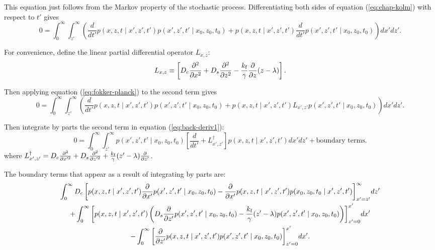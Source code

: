 \documentclass{article}
\newcommand{\tn}{\textnormal}
\newcommand{\stiff}{\frac{k_\tn{f}}{\gamma}}
\newcommand{\dd}{d}
\newcommand{\Der}[2]{\frac{\dd #1}{\dd #2}}
\newcommand{\Pder}[2]{\frac{\partial #1}{\partial #2}}
\newcommand{\Integral}[4]{\int_{#3}^{#4} {#1} \dd #2}
\newcommand{\xdiff}{\frac{\partial^2}{\partial x^2}}
\newcommand{\zdiff}{\frac{\partial^2}{\partial z^2}}
\begin{document}
This equation just follows from the Markov property of the stochastic
process. Differentiating both sides of equation (\ref{eq:chap-kolm})
with respect to $t'$ gives
\begin{equation}
  0 = \Integral{\Integral{\left(
      \Der{}{t'}p(x, z, t \mid x', z', t') p(x', z', t' \mid x_0, z_0, t_0)
      + p(x, z, t \mid x', z', t') \Der{}{t'}p(x', z', t' \mid x_0, z_0,
      t_0)\right)
    }{x'}{z'}{\infty}}{z'}{0}{\infty}.
\end{equation}

For convenience, define the linear partial differential operator
$L_{x, z}$:
\begin{equation}
  L_{x, z} \equiv \left[D_c \xdiff + D_s \zdiff - \stiff \Pder{}{z} (z
    - \lambda)\right].
  \label{eq:L-defn}
\end{equation}

Then applying equation (\ref{eq:fokker-planck}) to the second term gives 
\begin{equation}
  0 = \Integral{\Integral{\left(\Der{}{t'}p(x, z, t \mid x', z', t') p(x',
      z', t' \mid x_0, z_0, t_0) + p(x, z, t \mid x', z', t') L_{x', z'} p(x',
      z', t' \mid x_0, z_0, t_0)\right)}{x'}{z'}{\infty}}{z'}{0}{\infty}.
\label{eq:back-deriv1}
\end{equation}

Then integrate by parts the second term in equation
(\ref{eq:back-deriv1}):
\begin{equation}
  0 = \Integral{\Integral{p(x', z', t' \mid x_0, z_0, t_0) \left[\Der{}{t'}
        + L^\dag_{x', z'}\right] p(x, z, t \mid x', z',
      t')}{x'}{z'}{\infty}}{z'}{0}{\infty}
  + \text{boundary terms}.
  \label{eq:back-deriv2}
\end{equation}
where $L^\dag_{x', z'} = D_c \frac{\partial^2}{\partial x'^2} + D_s
\frac{\partial^2}{\partial z'^2} + \stiff (z' - \lambda) \Pder{}{z'}$.

The boundary terms that appear as a result of integrating by parts
are:
\begin{multline}
  \Integral{D_c \left[p(x, z, t \mid x', z', t') \Pder{}{x'} p(x', z',
      t' \mid x_0, z_0, t_0) - \Pder{}{x'} p(x, z, t \mid x', z', t') p(x_0,
      z_0, t_0 \mid x', z', t')\right]_{x' = z'}^\infty}{z'}{0}{\infty} \\
  + \Integral{\left[p(x, z, t \mid x', z', t') \left(D_s \Pder{}{z'} p(x',
      z', t' \mid x_0, z_0, t_0) - \stiff(z' - \lambda)p(x', z', t' \mid x_0,
      z_0, t_0)\right)\right]_{z' = 0}^{x'}}{x'}{0}{\infty} \\
  - \Integral{\left[\Pder{}{z'}p(x, z, t \mid x', z', t') p(x', z', t' \mid x_0,
      z_0, t_0)\right]_{z' = 0}^{x'}}{x'}{0}{\infty}.
\end{multline}
\end{document}
